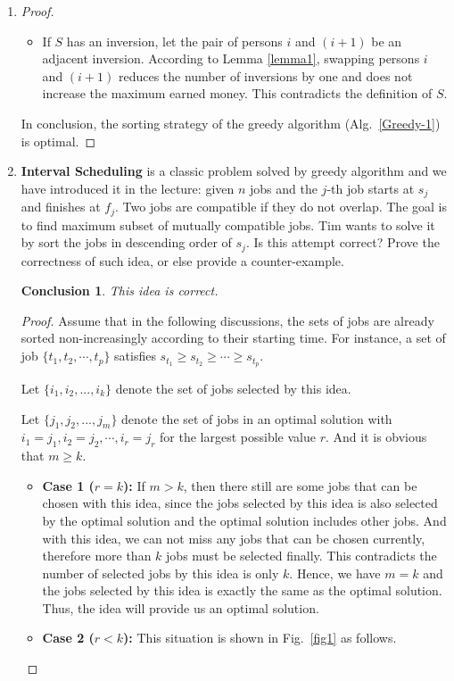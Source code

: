 \documentclass[12pt,a4paper]{article}
\makeatletter
\newtheorem*{solution}{Solution}
\newtheorem*{conclusion}{Conclusion}
\theoremstyle{definition}
\renewenvironment{solution}[1][Solution] {\par\pushQED{\qed}\normalfont\topsep6\p@\@plus6\p@\relax\trivlist\item[\hskip\labelsep\bfseries#1\@addpunct{.}]\ignorespaces}{\popQED\endtrivlist\@endpefalse} \makeatother
\makeatother
\begin{document}
\begin{enumerate}
\begin{solution}
\begin{enumerate}
\begin{proof}
\begin{itemize}
         \item If $S$ has an inversion, let the pair of persons $i$ and $(i+1)$ be an adjacent inversion. According to Lemma \ref{lemma1}, swapping persons $i$ and $(i+1)$ reduces the number of inversions by one and does not increase the maximum earned money. This contradicts the definition of $S$.
         \end{itemize}
         In conclusion, the sorting strategy of the greedy algorithm (Alg.~\ref{Greedy-1}) is optimal.
         \end{proof}
   \end{enumerate}
   \end{solution}
   \clearpage

    \item
    \textbf{Interval Scheduling} is a classic problem solved by greedy algorithm and we have introduced it in the lecture: given $n$ jobs and the $j$-th job starts at $s_j$ and finishes at $f_j$. Two jobs are compatible if they do not overlap. The goal is to find maximum subset of mutually compatible jobs. Tim wants to solve it by sort the jobs in descending order of $s_j$. Is this attempt correct? Prove the correctness of such idea, or else provide a counter-example.
   \begin{conclusion}
     This idea is correct.
   \end{conclusion}
   \begin{proof}
   Assume that in the following discussions, the sets of jobs are already sorted non-increasingly according to their starting time. For instance, a set of job $\{t_1, t_2, \cdots, t_p\}$ satisfies $s_{t_1} \geq s_{t_2} \geq \cdots \geq s_{t_p}$.

   Let $\{i_1, i_2, ..., i_k\}$ denote the set of jobs selected by this idea.

   Let $\{j_1, j_2, ..., j_m\}$ denote the set of jobs in an optimal solution with $i_1 = j_1, i_2 = j_2, \cdots, i_r = j_r$ for the largest possible value $r$. And it is obvious that $m \geq k$.
   \begin{itemize}
   \item \textbf{Case 1 ($r = k$):} If $m > k$, then there still are some jobs that can be chosen with this idea, since the jobs selected by this idea is also selected by the optimal solution and the optimal solution includes other jobs. And with this idea, we can not miss any jobs that can be chosen currently, therefore more than $k$ jobs must be selected finally. This contradicts the number of selected jobs by this idea is only $k$. Hence, we have $m = k$ and the jobs selected by this idea is exactly the same as the optimal solution. Thus, the idea will provide us an optimal solution.
   \item \textbf{Case 2 ($r < k$):} This situation is shown in Fig.~\ref{fig1} as follows.


\end{itemize}
\end{proof}
\end{enumerate}
\end{document}
